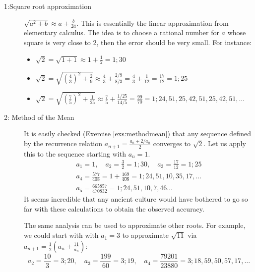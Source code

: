 \begin{description}\label{babroot}
	\item[1:\lstsp Square root approximation] $\sqrt{a^2\pm b}\approx a\pm\frac b{2a}$. This is essentially the linear approximation from elementary calculus. The idea is to choose a rational number for $a$ whose square is very close to 2, then the error should be very small. For instance:
	\begin{itemize}
  	\item $\sqrt 2=\sqrt{1+1}\approx 1+\frac 12=1;30$
  	\item $\sqrt 2=\sqrt{\left(\frac 43\right)^2+\frac 29}\approx\frac 43+\frac{2/9}{8/3}=\frac 43+\frac 1{12}=\frac{17}{12}=1;25$
  	\item $\sqrt 2=\sqrt{\left(\frac 75\right)^2+\frac 1{25}}\approx \frac 75+\frac{1/25}{14/5}=\frac{99}{70}=1;24,51,25,42,51,25,42,51,\ldots$
	\end{itemize}
	
	\item[2: Method of the Mean]\label{methodmean} It is easily checked (Exercise \ref{exs:methodmean}) that any sequence defined by the recurrence relation $a_{n+1}=\frac{a_n+2/a_n}2$ converges to $\sqrt 2$. Let us apply this to the sequence starting with $a_n=1$.
	\begin{gather*}
		a_1=1,\quad a_2=\frac 32=1;30,\quad a_3=\frac{17}{12}=1;25\\
		a_4=\frac{577}{408}=1+\frac{169}{408}=1;24,51,10,35,17,\ldots\\
		a_5=\frac{665857}{470832}=1;24,51,10,7,46\ldots
	\end{gather*}
	It seems incredible that any ancient culture would have bothered to go so far with these calculations to obtain the observed accuracy.\smallbreak

	The same analysis can be used to approximate other roots. For example, we could start with with $a_1=3$ to approximate $\sqrt{11}$ via $a_{n+1}=\frac 12(a_n+\frac{11}{a_n})$:
	\[a_2=\frac{10}3=3;20,\quad a_3=\frac{199}{60}=3;19,\quad a_4=\frac{79201}{23880}=3;18,59,50,57,17,\ldots\]
\end{description}





